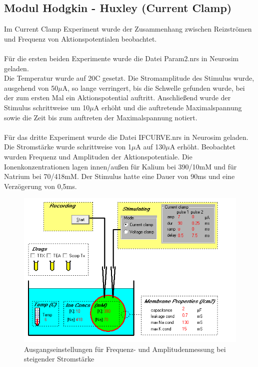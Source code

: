\documentclass[a4paper]{article}
\begin{document}
\subsection{Modul Hodgkin - Huxley (Current Clamp)}
Im Current Clamp Experiment wurde der Zusammenhang zwischen Reizströmen und Frequenz von Aktionspotentialen beobachtet.\\
\\
Für die ersten beiden Experimente wurde die Datei Param2.nrs in Neurosim geladen.\\
Die Temperatur wurde auf 20\textdegree{}C gesetzt. Die Stromamplitude des Stimulus wurde, ausgehend von 50\(\mu\)A, so lange verringert, bis die Schwelle gefunden wurde, bei der zum ersten Mal ein Aktionspotential auftritt. Anschließend wurde der Stimulus schrittweise um 10\(\mu\)A erhöht und die auftretende Maximalspannung sowie die Zeit bis zum auftreten der Maximalspannung notiert.\\
\\
Für das dritte Experiment wurde die Datei IFCURVE.nrs in Neurosim geladen.\\
Die Stromstärke wurde schrittweise von 1\(\mu\)A auf 130\(\mu\)A erhöht. Beobachtet wurden Frequenz und Amplituden der Aktionspotentiale. Die Ionenkonzentrationen lagen innen/außen für Kalium bei 390/10mM und für Natrium bei 70/418mM. Der Stimulus hatte eine Dauer von 90ms und eine Verzögerung von 0,5ms.
\begin{figure}[H]
    \centering
    \includegraphics{images/Aufgabe2_4_Setup.png}
    \caption{Ausgangseinstellungen für Frequenz- und Amplitudenmessung bei steigender Stromstärke}
    \label{fig:A2_4_Setup}
\end{figure}
\end{document}
